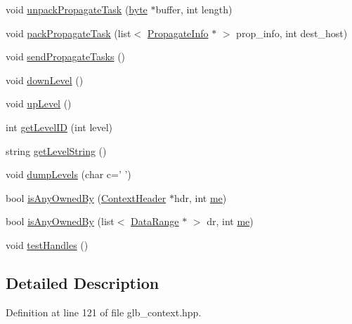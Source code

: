 \begin{DoxyCompactItemize}
\item 
void \hyperlink{class_global_context_a2f62ad628b6c5d48c2cda3ea05e08860}{unpackPropagateTask} (\hyperlink{engine_8hpp_a0c8186d9b9b7880309c27230bbb5e69d}{byte} $\ast$buffer, int length)
\item 
void \hyperlink{class_global_context_ab6ed24acc55b88a93b7498acbccf6141}{packPropagateTask} (list$<$ \hyperlink{struct_propagate_info}{PropagateInfo} $\ast$ $>$ prop\_\-info, int dest\_\-host)
\item 
void \hyperlink{class_global_context_ab7a7663698431c03044fb91223a8b0df}{sendPropagateTasks} ()
\item 
void \hyperlink{class_global_context_acdb15ae187d6c84b42851ddb94191eec}{downLevel} ()
\item 
void \hyperlink{class_global_context_a2afcc7411f13bee3be175887de0d5365}{upLevel} ()
\item 
int \hyperlink{class_global_context_a6e83bae803b2a595b2679b6b34bd572f}{getLevelID} (int level)
\item 
string \hyperlink{class_global_context_a3f1200ddc2119935fac3b8b4ef5143d1}{getLevelString} ()
\item 
void \hyperlink{class_global_context_a016ede40f469516e58cdc0a720d77bd7}{dumpLevels} (char c=' ')
\item 
bool \hyperlink{class_global_context_aab60de99c252ba5fe7e2d1fdbfa0ba6c}{isAnyOwnedBy} (\hyperlink{class_context_header}{ContextHeader} $\ast$hdr, int \hyperlink{mpi__comm_8hpp_a94bbc6e3d7712df24be96e5e83d0aaf8}{me})
\item 
bool \hyperlink{class_global_context_a33b1aec3eb90bf8bfca3307d47058606}{isAnyOwnedBy} (list$<$ \hyperlink{struct_data_range}{DataRange} $\ast$ $>$ dr, int \hyperlink{mpi__comm_8hpp_a94bbc6e3d7712df24be96e5e83d0aaf8}{me})
\item 
void \hyperlink{class_global_context_aeb21e846898eaf2a7ec28ded66cf4d17}{testHandles} ()
\end{DoxyCompactItemize}


\subsection{Detailed Description}


Definition at line 121 of file glb\_\-context.hpp.

